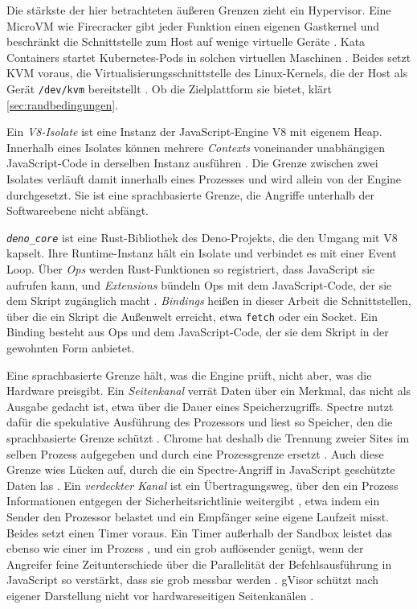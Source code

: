 Die stärkste der hier betrachteten äußeren Grenzen zieht ein Hypervisor. Eine MicroVM wie Firecracker gibt jeder Funktion einen eigenen
Gastkernel und beschränkt die Schnittstelle zum Host auf wenige virtuelle Geräte
\autocite[S.~420, 426]{agache_firecracker_2020}. Kata Containers startet Kubernetes-Pods in solchen virtuellen Maschinen
\autocite{the_kata_containers_authors_hypervisors_2026}. Beides setzt \ac{KVM} voraus, die Virtualisierungsschnittstelle
des Linux-Kernels, die der Host als Gerät \texttt{/dev/kvm} bereitstellt \autocite{the_firecracker_authors_getting_2026}.
Ob die Zielplattform sie bietet, klärt \autoref{sec:randbedingungen}.

Ein \emph{V8-Isolate} ist eine Instanz der JavaScript-Engine V8 mit eigenem Heap. Innerhalb eines
Isolates können mehrere \emph{Contexts} voneinander unabhängigen JavaScript-Code in derselben Instanz
ausführen \autocite{the_v8_authors_getting_2026}. Die Grenze zwischen zwei Isolates verläuft damit
innerhalb eines Prozesses und wird allein von der Engine durchgesetzt. Sie ist eine sprachbasierte
Grenze, die Angriffe unterhalb der Softwareebene nicht abfängt.

\emph{\texttt{deno\_core}} ist eine Rust-Bibliothek des Deno-Projekts, die den Umgang mit V8
kapselt. Ihre Runtime-Instanz hält ein Isolate und verbindet es mit einer Event Loop. Über
\emph{Ops} werden Rust-Funktionen so registriert, dass JavaScript sie aufrufen kann, und
\emph{Extensions} bündeln Ops mit dem JavaScript-Code, der sie dem Skript zugänglich macht
\autocite{iwanczuk_roll_2022}. \emph{Bindings} heißen in dieser Arbeit die Schnittstellen, über die ein
Skript die Außenwelt erreicht, etwa \texttt{fetch} oder ein Socket. Ein Binding besteht aus Ops
und dem JavaScript-Code, der sie dem Skript in der gewohnten Form anbietet.

Eine sprachbasierte Grenze hält, was die Engine prüft, nicht aber, was die Hardware preisgibt. Ein \emph{Seitenkanal}
verrät Daten über ein Merkmal, das nicht als Ausgabe gedacht ist, etwa über die Dauer eines Speicherzugriffs. Spectre
nutzt dafür die spekulative Ausführung des Prozessors und liest so Speicher, den die sprachbasierte Grenze schützt
\autocite[S.~1--2]{kocher_spectre_2019}. Chrome hat deshalb die Trennung zweier Sites im selben Prozess aufgegeben und
durch eine Prozessgrenze ersetzt \autocites[S.~1661--1662]{reis_site_2019}[S.~1]{mcilroy_spectre_2019}. Auch diese
Grenze wies Lücken auf, durch die ein Spectre-Angriff in JavaScript geschützte Daten las
\autocite[S.~699]{agarwal_spookjs_2022}. Ein
\emph{verdeckter Kanal} ist ein Übertragungsweg, über den ein Prozess Informationen entgegen der Sicherheitsrichtlinie
weitergibt \autocite[S.~107]{dod_trusted_1985}, etwa indem ein Sender den Prozessor belastet und ein Empfänger seine
eigene Laufzeit misst. Beides setzt einen Timer voraus. Ein Timer außerhalb der Sandbox leistet
das ebenso wie einer im Prozess \autocite[S.~1]{schwarzl_remote-timer-as--service_2026}, und ein grob auflösender genügt, wenn
der Angreifer feine Zeitunterschiede über die Parallelität der Befehlsausführung in JavaScript so verstärkt, dass sie grob
messbar werden \autocite[S.~355--356]{xiao_hacky_2023}. gVisor schützt nach eigener
Darstellung nicht vor hardwareseitigen Seitenkanälen \autocite{the_gvisor_authors_security_2026}.

